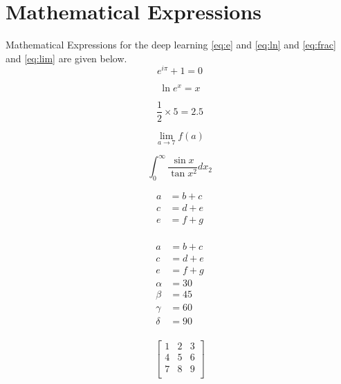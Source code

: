 \documentclass{article}
\begin{document}

\section{Mathematical Expressions}
Mathematical Expressions for the deep learning \ref{eq:e} and \ref{eq:ln} and \ref{eq:frac} and \ref{eq:lim} are given below.\\
\begin{equation}
    e^{i\pi}+1 = 0
    \label{eq:e}
\end{equation}

\begin{equation}
    \ln e^{x} = x
    \label{eq:ln}
\end{equation}

\begin{equation}
    \frac{1}{2} \times 5 = 2.5
    \label{eq:frac}
\end{equation}

\begin{equation}
    \lim_{a \rightarrow 7} f(a)
    \label{eq:lim}
\end{equation}

\begin{equation}
    \int_{0}^{\infty} \frac{\sin {x}}{\tan {{x}^{2}}} dx_2
    \label{eq:int}
\end{equation}

\begin{align*}
    a & = b + c \\
   c & = d + e \\
   e & = f + g \\
\end{align*}

\begin{equation}
    \begin{split}
        a & = b + c \\
        c & = d + e \\
        e & = f + g \\
        \alpha &= 30  \\
        \beta &= 45 \\
        \gamma &= 60  \\
        \delta &= 90  \\
    \end{split}
    \label{eq:eqs2}
\end{equation}

\begin{equation}
    \begin{bmatrix}
        1 & 2 & 3 \\
        4 & 5 & 6 \\
        7 & 8 & 9 \\
    \end{bmatrix}
\end{equation}
\end{document}
